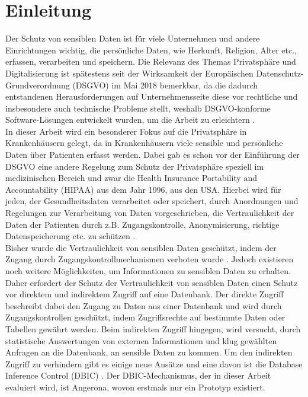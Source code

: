 \documentclass[german,version-2020-11]{uzl-thesis}
\begin{document}
\chapter{Einleitung}
Der Schutz von sensiblen Daten ist für viele Unternehmen und andere Einrichtungen wichtig, die persönliche Daten, wie Herkunft, Religion, Alter etc., erfassen, verarbeiten und speichern. Die Relevanz des Themas Privatsphäre und Digitalisierung ist spätestens seit der Wirksamkeit der Europäischen Datenschutz-Grundverordnung (DSGVO) \cite{1} im  Mai 2018 bemerkbar, da die dadurch entstandenen Herausforderungen auf Unternehmensseite diese vor rechtliche und insbesondere auch technische Probleme stellt, weshalb DSGVO-konforme Software-Lösungen entwickelt wurden, um die Arbeit zu erleichtern \cite{9}.\\ 
In dieser Arbeit wird ein besonderer Fokus auf die Privatsphäre in Krankenhäusern gelegt, da in Krankenhäusern viele sensible und persönliche Daten über Patienten erfasst werden. Dabei gab es schon vor der Einführung der DSGVO eine andere Regelung zum Schutz der Privatsphäre speziell im medizinischen Bereich und zwar die Health Insurance Portability and Accountability (HIPAA) aus dem Jahr 1996, aus den USA. Hierbei wird für jeden, der Gesundheitsdaten verarbeitet oder speichert, durch Anordnungen und Regelungen zur Verarbeitung von Daten vorgeschrieben, die Vertraulichkeit der Daten der Patienten durch z.B. Zugangskontrolle, Anonymisierung, richtige Datenspeicherung etc. zu schützen \cite{7}.\\
Bisher wurde die Vertraulichkeit von sensiblen Daten geschützt, indem der Zugang durch Zugangskontrollmechanismen verboten wurde \cite{2}. Jedoch existieren noch weitere Möglichkeiten, um Informationen zu sensiblen Daten zu erhalten. Daher erfordert der Schutz der Vertraulichkeit von sensiblen Daten einen Schutz vor direktem und indirektem Zugriff auf eine Datenbank. Der direkte Zugriff beschreibt dabei den Zugang zu Daten aus einer Datenbank und wird durch Zugangskontrollen geschützt, indem Zugriffsrechte auf bestimmte Daten oder Tabellen gewährt werden. Beim indirekten Zugriff hingegen, wird versucht, durch statistische Auswertungen von externen Informationen und klug gewählten Anfragen an die Datenbank, an sensible Daten zu kommen. Um den indirekten Zugriff zu verhindern gibt es einige neue Ansätze und eine davon ist die Database Inference Control (DBIC) \cite{22}. Der DBIC-Mechanismus, der in dieser Arbeit evaluiert wird, ist Angerona, wovon erstmals nur ein Prototyp existiert. \cite{guarnieri2017securing} \\ 
\end{document}
